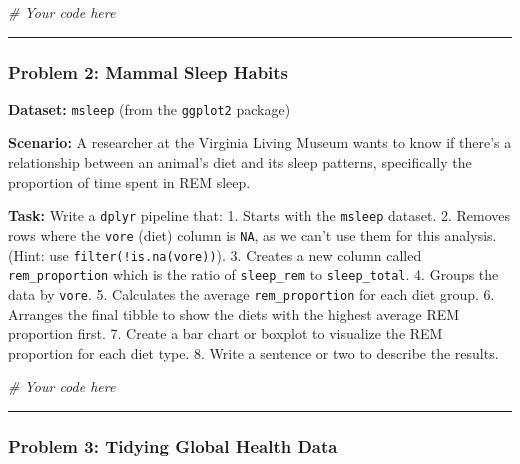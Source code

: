 \documentclass[
  11pt,
]{article}
\newenvironment{Shaded}{\begin{snugshade}}{\end{snugshade}}
\newcommand{\CommentTok}[1]{\textcolor[rgb]{0.56,0.35,0.01}{\textit{#1}}}
\begin{document}
\begin{Shaded}
\begin{Highlighting}[]
\CommentTok{\# Your code here}
\end{Highlighting}
\end{Shaded}

\begin{center}\rule{0.5\linewidth}{0.5pt}\end{center}

\subsubsection{Problem 2: Mammal Sleep
Habits}\label{problem-2-mammal-sleep-habits}

\textbf{Dataset:} \texttt{msleep} (from the \texttt{ggplot2} package)

\textbf{Scenario:} A researcher at the Virginia Living Museum wants to
know if there's a relationship between an animal's diet and its sleep
patterns, specifically the proportion of time spent in REM sleep.

\textbf{Task:} Write a \texttt{dplyr} pipeline that: 1. Starts with the
\texttt{msleep} dataset. 2. Removes rows where the \texttt{vore} (diet)
column is \texttt{NA}, as we can't use them for this analysis. (Hint:
use \texttt{filter(!is.na(vore))}). 3. Creates a new column called
\texttt{rem\_proportion} which is the ratio of \texttt{sleep\_rem} to
\texttt{sleep\_total}. 4. Groups the data by \texttt{vore}. 5.
Calculates the average \texttt{rem\_proportion} for each diet group. 6.
Arranges the final tibble to show the diets with the highest average REM
proportion first. 7. Create a bar chart or boxplot to visualize the REM
proportion for each diet type. 8. Write a sentence or two to describe
the results.

\begin{Shaded}
\begin{Highlighting}[]
\CommentTok{\# Your code here}
\end{Highlighting}
\end{Shaded}

\begin{center}\rule{0.5\linewidth}{0.5pt}\end{center}

\subsubsection{Problem 3: Tidying Global Health
Data}\label{problem-3-tidying-global-health-data}
\end{document}

